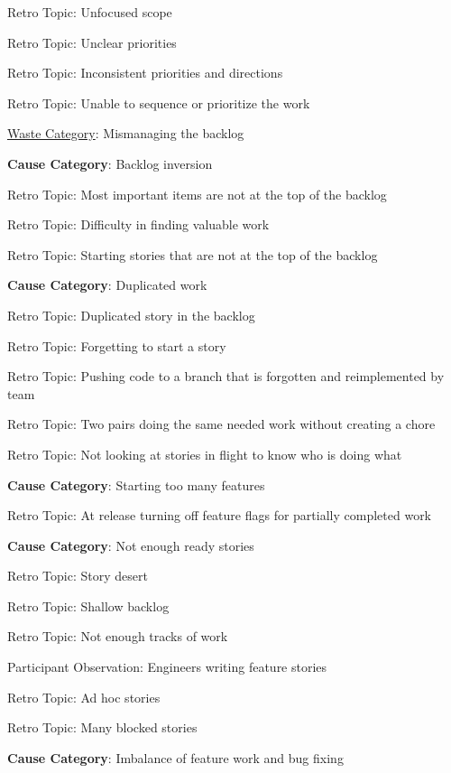 \quad \quad \quad Retro Topic: Unfocused scope

\quad \quad \quad Retro Topic: Unclear priorities

\quad \quad \quad Retro Topic: Inconsistent priorities and directions

\quad \quad \quad Retro Topic: Unable to sequence or prioritize the work





\underline{Waste Category}: Mismanaging the backlog

\quad \textbf{Cause Category}: Backlog inversion

\quad \quad Retro Topic: Most important items are not at the top of the backlog

\quad \quad Retro Topic: Difficulty in finding valuable work

\quad \quad Retro Topic: Starting stories that are not at the top of the backlog

\quad \textbf{Cause Category}: Duplicated work

\quad \quad Retro Topic: Duplicated story in the backlog

\quad \quad Retro Topic: Forgetting to start a story

\quad \quad Retro Topic: Pushing code to a branch that is forgotten and reimplemented by team

\quad \quad Retro Topic: Two pairs doing the same needed work without creating a chore

\quad \quad Retro Topic: Not looking at stories in flight to know who is doing what

\quad \textbf{Cause Category}: Starting too many features

\quad \quad Retro Topic: At release turning off feature flags for partially completed work

\quad \textbf{Cause Category}: Not enough ready stories

\quad \quad Retro Topic: Story desert

\quad \quad Retro Topic: Shallow backlog

\quad \quad Retro Topic: Not enough tracks of work

\quad \quad Participant Observation: Engineers writing feature stories

\quad \quad Retro Topic: Ad hoc stories

\quad \quad Retro Topic: Many blocked stories

\quad \textbf{Cause Category}: Imbalance of feature work and bug fixing

